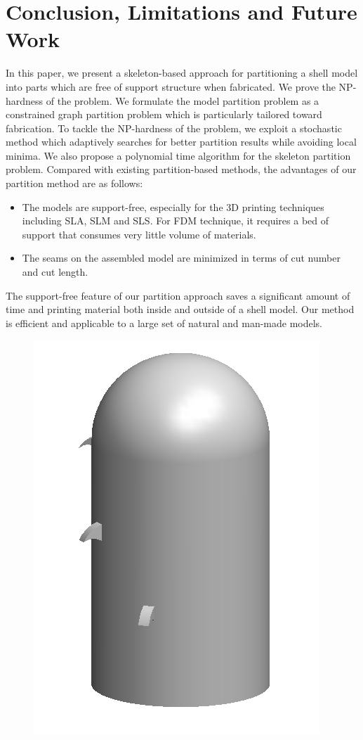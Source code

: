 \section{Conclusion, Limitations and Future Work}

In this paper, we present a skeleton-based approach for partitioning a shell model into parts which are free of support structure when fabricated. We prove the NP-hardness of the problem. We formulate the model partition problem as a constrained graph partition problem which is particularly tailored toward fabrication. To tackle the NP-hardness of the problem, we exploit a stochastic method which adaptively searches for better partition results while avoiding local minima. We also propose a polynomial time algorithm for the skeleton partition problem.
Compared with existing partition-based methods, the advantages of our partition method are as follows:

\begin{itemize}
 \item The models are support-free, especially for the 3D printing techniques including SLA, SLM and SLS. For FDM technique, it requires a bed of support that consumes very little volume of materials.
\item The seams on the assembled model are minimized in terms of cut number and cut length.
\end{itemize}

The support-free feature of our partition approach saves a significant amount of time and printing material both inside and outside of a shell model. Our method is efficient and applicable to a large set of natural and man-made models.
\begin{figure} %
\vspace{-.1in}
\includegraphics[width=0.25\columnwidth]{figs/limit.png}
\end{figure}

